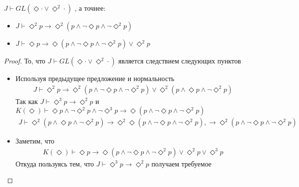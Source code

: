 \documentclass[12pt,a4paper,oneside]{article} \usepackage[left=2cm, right=2cm, top=1.3cm,
\begin{document}
  \begin{corollary}
    $J \vdash  GL(\Diamond \cdot \vee  \Diamond ^2\cdot)$ , а точнее:
    \begin{itemize}
      \item $J \vdash  \Diamond ^2 p \rightarrow  \Diamond ^2(p \wedge  \neg \Diamond p \wedge 
            \neg \Diamond ^2 p)$ 
      \item $J \vdash  \Diamond  p \rightarrow  \Diamond (p \wedge  \neg \Diamond p \wedge 
            \neg \Diamond ^2 p) \vee  \Diamond ^2 p$ 
    \end{itemize}
  \end{corollary}
  \begin{proof}
    То, что $J \vdash  GL(\Diamond \cdot \vee  \Diamond ^2\cdot)$ является следствием следующих
    пунктов
    \begin{itemize}
      \item Используя предыдущее предложение и нормальность
      \begin{align*}
        J \vdash  \Diamond ^2 p \rightarrow  \Diamond ^2(p \wedge  \neg \Diamond p \wedge 
        \neg \Diamond ^2 p) \vee  \Diamond ^2(p \wedge  \Diamond p \wedge  \neg \Diamond ^2 p)
      \end{align*}
      Так как $J \vdash  \Diamond ^3 p \rightarrow  \Diamond ^2 p$ и $K(\Diamond ) \vdash 
      \Diamond p \wedge  \neg \Diamond ^2 p \wedge  \neg \Diamond ^3 p \rightarrow  \Diamond (p
      \wedge  \neg \Diamond p \wedge  \neg \Diamond ^2 p)$ 
      \begin{align*}
        J \vdash  \Diamond ^2(p \wedge  \Diamond p \wedge  \neg \Diamond ^2 p) \rightarrow 
        \Diamond ^2\Diamond (p \wedge  \neg \Diamond p \wedge  \neg \Diamond ^2 p), \rightarrow 
        \Diamond ^2(p \wedge  \neg \Diamond p \wedge  \neg \Diamond ^2 p)
      \end{align*}
      \item Заметим, что
      \begin{align*}
        K(\Diamond ) \vdash  \Diamond p \rightarrow  \Diamond (p \wedge  \neg \Diamond p \wedge 
        \neg \Diamond ^2 p) \vee  \Diamond ^2 p \vee  \Diamond ^3 p
      \end{align*}
      Откуда пользуясь тем, что $J \vdash  \Diamond ^3 p \rightarrow  \Diamond ^2 p$ получаем
      требуемое
    \end{itemize}
  \end{proof}
\end{document}

